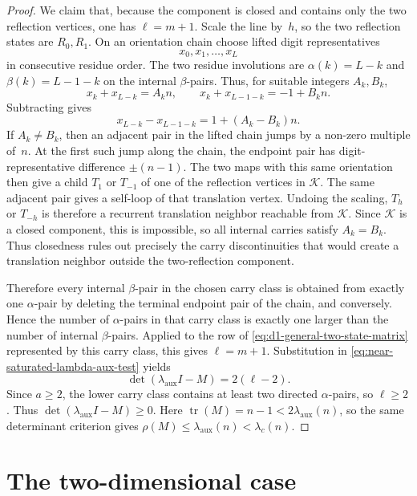 \documentclass{amsart}
\theoremstyle{definition}
\theoremstyle{remark}
\begin{document}
\begin{proof}
We claim that, because the component is closed and contains only the two
reflection vertices, one has \(\ell=m+1\).  Scale the line by~\(h\), so
the two reflection states are \(R_0,R_1\).  On an orientation chain choose
lifted digit representatives
\[
  x_0,x_1,\ldots,x_L
\]
in consecutive residue order.  The two residue involutions are
\(\alpha(k)=L-k\) and \(\beta(k)=L-1-k\) on the internal
\(\beta\)-pairs.  Thus, for suitable integers \(A_k,B_k\),
\[
  x_k+x_{L-k}=A_k n,
  \qquad
  x_k+x_{L-1-k}=-1+B_k n.
\]
Subtracting gives
\begin{equation}\label{eq:d1-carry-difference}
  x_{L-k}-x_{L-1-k}=1+(A_k-B_k)n.
\end{equation}
If \(A_k\ne B_k\), then an adjacent pair in the lifted chain jumps by a
non-zero multiple of~\(n\).  At the first such jump along the chain, the
endpoint pair has digit-representative difference \(\pm(n-1)\).  The two
maps with this same orientation then give a child \(T_1\) or \(T_{-1}\)
of one of the reflection vertices in \(\mathcal K\).  The same adjacent
pair gives a self-loop of that translation vertex.  Undoing the scaling,
\(T_h\) or \(T_{-h}\) is therefore a recurrent translation neighbor
reachable from \(\mathcal K\).  Since \(\mathcal K\) is a closed
component, this is impossible, so all internal carries satisfy
\(A_k=B_k\).
Thus closedness rules out precisely the carry discontinuities that would
create a translation neighbor outside the two-reflection component.

Therefore every internal \(\beta\)-pair in the chosen carry class is
obtained from exactly one \(\alpha\)-pair by deleting the terminal
endpoint pair of the chain, and conversely.  Hence the number of
\(\alpha\)-pairs in that carry class is exactly one larger than the
number of internal \(\beta\)-pairs.  Applied to the row of
\eqref{eq:d1-general-two-state-matrix} represented by this carry class,
this gives \(\ell=m+1\).  Substitution in
\eqref{eq:near-saturated-lambda-aux-test} yields
\[
  \det(\lambda_{\mathrm{aux}} I-M)=2(\ell-2).
\]
Since \(a\ge2\), the lower carry class contains at least two directed
\(\alpha\)-pairs, so \(\ell\ge2\).  Thus
\(\det(\lambda_{\mathrm{aux}} I-M)\ge0\).  Here
\(\operatorname{tr}(M)=n-1<2\lambda_{\mathrm{aux}}(n)\), so the same
determinant criterion gives
\(\rho(M)\le\lambda_{\mathrm{aux}}(n)<\lambda_c(n)\).
\end{proof}

\section{The two-dimensional case}
\label{sec:d2}
\end{document}
